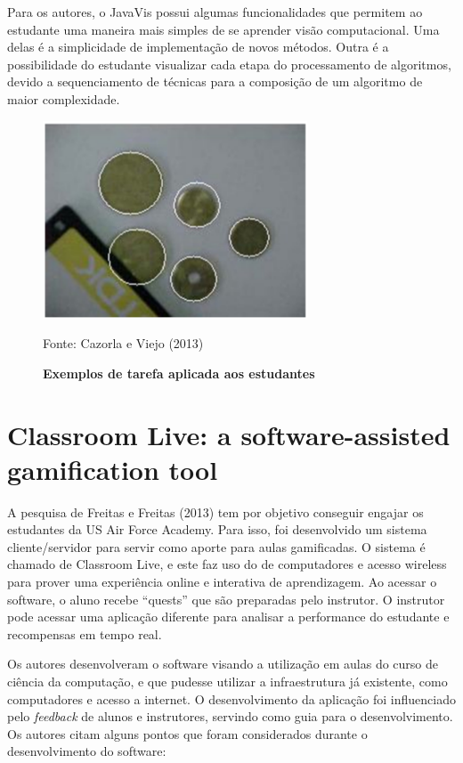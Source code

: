 \documentclass[
	12pt,				%
	oneside,			%
	a4paper,			%
	english,			%
	french,				%
	spanish,			%
	brazil,				%
	]{abntex2}
\begin{document}
Para os autores, o JavaVis possui algumas funcionalidades que permitem ao estudante uma maneira mais simples de se aprender visão computacional. Uma delas é a simplicidade de implementação de novos métodos. Outra é a possibilidade do estudante visualizar cada etapa do processamento de algoritmos, devido a sequenciamento de técnicas para a composição de um algoritmo de maior complexidade.

\begin{figure}[ht]
\centering
\caption{\textbf{Exemplos de tarefa aplicada aos estudantes}}
\includegraphics[width=0.7\textwidth]{imagens/javavis_avaliacao.png}

Fonte: Cazorla e Viejo  (2013)
\label{fig:javavis_avaliacao}
\end{figure}

\section{Classroom Live: a software-assisted gamification tool}

A pesquisa de Freitas e Freitas (2013) tem por objetivo conseguir engajar os estudantes da US Air Force Academy. Para isso, foi desenvolvido um sistema cliente/servidor para servir como aporte para aulas gamificadas. O sistema é chamado de Classroom Live, e este faz uso do de computadores e acesso wireless para prover uma experiência online e interativa de aprendizagem. Ao acessar o software, o aluno recebe “quests” que são preparadas pelo instrutor. O instrutor pode acessar uma aplicação diferente para analisar a performance do estudante e recompensas em tempo real.

Os autores desenvolveram o software visando a utilização em aulas do curso de ciência da computação, e que pudesse utilizar a infraestrutura já existente, como computadores e acesso a internet. O desenvolvimento da aplicação foi influenciado pelo \textit{feedback} de alunos e instrutores, servindo como guia para o desenvolvimento. Os autores citam alguns pontos que foram considerados durante o desenvolvimento do software:
\end{document}
